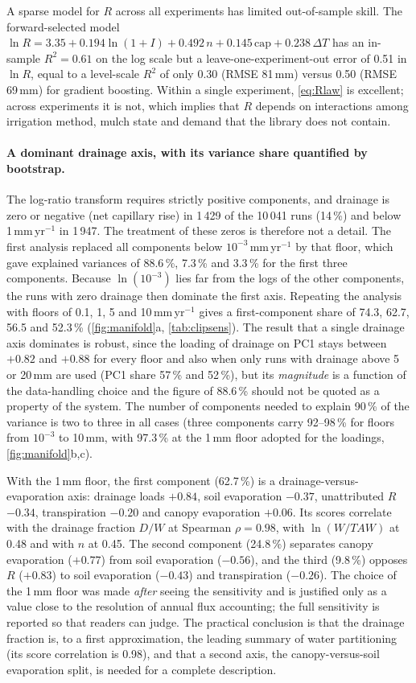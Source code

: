 \documentclass[preprint,12pt,authoryear]{elsarticle}
\newcommand{\TAW}{\mathit{TAW}}
\begin{document}
A sparse model for $R$ across all experiments has limited out-of-sample skill. The forward-selected model $\ln R=3.35+0.194\ln(1+I)+0.492\,n+0.145\,\mathrm{cap}+0.238\,\Delta T$ has an in-sample $R^2=0.61$ on the log scale but a leave-one-experiment-out error of 0.51 in $\ln R$, equal to a level-scale $R^2$ of only 0.30 (RMSE 81\,mm) versus 0.50 (RMSE 69\,mm) for gradient boosting. Within a single experiment, \cref{eq:Rlaw} is excellent; across experiments it is not, which implies that $R$ depends on interactions among irrigation method, mulch state and demand that the library does not contain.

\paragraph{A dominant drainage axis, with its variance share quantified by bootstrap.}
The log-ratio transform requires strictly positive components, and drainage is zero or negative (net capillary rise) in 1\,429 of the 10\,041 runs (14\,\%) and below 1\,mm\,yr$^{-1}$ in 1\,947. The treatment of these zeros is therefore not a detail. The first analysis replaced all components below $10^{-3}$\,mm\,yr$^{-1}$ by that floor, which gave explained variances of 88.6\,\%, 7.3\,\% and 3.3\,\% for the first three components. Because $\ln(10^{-3})$ lies far from the logs of the other components, the runs with zero drainage then dominate the first axis. Repeating the analysis with floors of 0.1, 1, 5 and 10\,mm\,yr$^{-1}$ gives a first-component share of 74.3, 62.7, 56.5 and 52.3\,\% (\cref{fig:manifold}a, \cref{tab:clipsens}). The result that a single drainage axis dominates is robust, since the loading of drainage on PC1 stays between $+0.82$ and $+0.88$ for every floor and also when only runs with drainage above 5 or 20\,mm are used (PC1 share 57\,\% and 52\,\%), but its \emph{magnitude} is a function of the data-handling choice and the figure of 88.6\,\% should not be quoted as a property of the system. The number of components needed to explain 90\,\% of the variance is two to three in all cases (three components carry 92--98\,\% for floors from $10^{-3}$ to 10\,mm, with 97.3\,\% at the 1\,mm floor adopted for the loadings, \cref{fig:manifold}b,c).

With the 1\,mm floor, the first component (62.7\,\%) is a drainage-versus-evaporation axis: drainage loads $+0.84$, soil evaporation $-0.37$, unattributed $R$ $-0.34$, transpiration $-0.20$ and canopy evaporation $+0.06$. Its scores correlate with the drainage fraction $D/W$ at Spearman $\rho=0.98$, with $\ln(W/\TAW)$ at 0.48 and with $n$ at 0.45. The second component (24.8\,\%) separates canopy evaporation ($+0.77$) from soil evaporation ($-0.56$), and the third (9.8\,\%) opposes $R$ ($+0.83$) to soil evaporation ($-0.43$) and transpiration ($-0.26$). The choice of the 1\,mm floor was made \emph{after} seeing the sensitivity and is justified only as a value close to the resolution of annual flux accounting; the full sensitivity is reported so that readers can judge. The practical conclusion is that the drainage fraction is, to a first approximation, the leading summary of water partitioning (its score correlation is 0.98), and that a second axis, the canopy-versus-soil evaporation split, is needed for a complete description.
\end{document}

